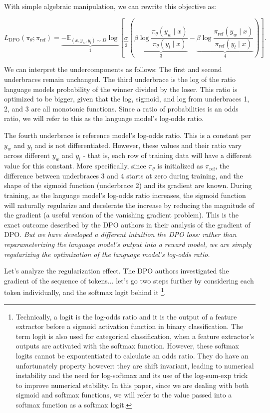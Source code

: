 \documentclass[twoside,11pt]{article}
\begin{document}
With simple algebraic manipulation, we can rewrite this objective as:

\[
  \label{eq:reg}
  L_\mathrm{DPO}(\pi_\theta; \pi_\mathrm{ref}) =
  \underbrace{
  -\mathbb{E}_{(x, y_w, y_l) \sim D} 
  \log }_{1} 
  \left[ 
    \underbrace{\sigma }_{2}
    \left(
    \underbrace{\beta \log \frac{\pi_\theta(y_w \mid x)}{\pi_\theta(y_l \mid x)}}_{3}
    - \underbrace{\beta \log \frac{\pi_\mathrm{ref}(y_w \mid x)}{\pi_\mathrm{ref}(y_l \mid x)}}_{4} 
    \right)
  \right].
\]

We can interpret the undercomponents as follows: 
The first and second underbraces remain unchanged. 
The third underbrace is the log of the ratio
language models probability of the winner divided by the loser. This ratio 
is optimized to be bigger, given that the log, sigmoid, and log from underbraces
1, 2, and 3 are all monotonic functions. Since a ratio of probabilities is
an odds ratio, we will refer to this as the 
language model's log-odds ratio. 

The fourth underbrace is reference model's log-odds ratio. This
is a constant per $y_w$ and $y_l$ and is not differentiated. However,
these values and their ratio vary across different $y_w$ and $y_l$ - that is,
each row of training data will have a different value for this constant. 
More specifically, since $\pi_\theta$ is initialized as $\pi_\mathrm{ref}$, 
the difference between underbraces 3 and 4 starts at zero during training, 
and the shape of the sigmoid function (underbrace 2) and its gradient are
known. During training, as the language model's log-odds ratio increases,
the sigmoid function will naturally regularize and decelerate
the increase by reducing the magnitude of the gradient (a 
useful version of the vanishing gradient problem). 
This is the exact outcome described by the DPO authors 
in their analysis of the gradient of DPO. \emph{But we have developed a different
intuition the DPO loss: rather than reparameterizing the language model's
output into a reward model, we are simply regularizing the optimization of 
the language model's log-odds ratio.}

Let's analyze the regularization effect. The DPO authors investigated
the gradient of the sequence of tokens... let's go two steps further
by considering each token individually, and the softmax logit behind it \footnote{
  Technically, a logit is the log-odds ratio and it is the output of a 
  feature extractor before a sigmoid activation function in binary
  classification. The term logit is also used for categorical classification,
  when a feature extractor's outputs are 
  activated with the softmax function. However,
  these softmax logits cannot be expontentiated to calculate an odds ratio. 
  They do have an unfortunately property
  however: they are shift invariant, leading to numerical instability and
  the need for log-softmax and its use of the log-sum-exp trick to improve
  numerical stability. In this paper, since we are dealing
  with both sigmoid and softmax functions, we will refer to the value
  passed into a softmax function as a softmax logit.
}. 
\end{document}
